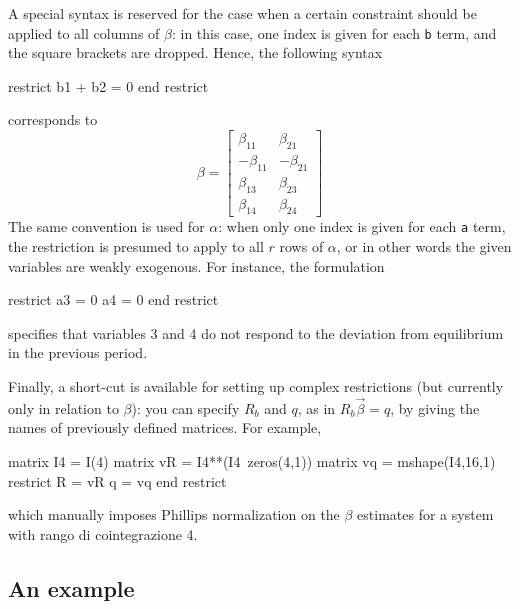 A special syntax is reserved for the case when a certain constraint
should be applied to all columns of $\beta$: in this case, one index is
given for each \texttt{b} term, and the square brackets are dropped.
Hence, the following syntax
\begin{code}
restrict
  b1 + b2 = 0
end restrict
\end{code}
corresponds to
\[
\beta = \left[
\begin{array}{rr}
\beta_{11} & \beta_{21} \\
-\beta_{11} & -\beta_{21} \\
\beta_{13} & \beta_{23} \\
\beta_{14} & \beta_{24}
\end{array}
\right]
\]
The same convention is used for $\alpha$: when only one index is given for
each \texttt{a} term, the restriction is presumed to apply to all $r$
rows of $\alpha$, or in other words the given variables are weakly
exogenous. For instance, the formulation
%
\begin{code}
restrict
  a3 = 0
  a4 = 0
end restrict
\end{code}
%
specifies that variables 3 and 4 do not respond to the deviation from
equilibrium in the previous period.  

Finally, a short-cut is available for setting up complex restrictions (but
currently only in relation to $\beta$): you can specify $R_b$ and $q$,
as in $R_b \vec{\beta} = q$, by giving the names of previously
defined matrices.  For example,
%
\begin{code}
matrix I4 = I(4)
matrix vR = I4**(I4~zeros(4,1))
matrix vq = mshape(I4,16,1)
restrict
  R = vR
  q = vq
end restrict
\end{code}
%
which manually imposes Phillips normalization on the $\beta$ estimates
for a system with rango di cointegrazione 4.
 
\subsection{An example}
\label{sec:vecm-overid-ex}

